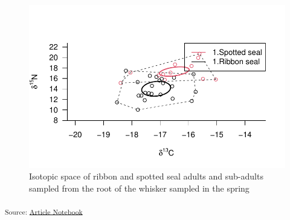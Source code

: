 \documentclass[
  letterpaper,
  DIV=11,
  numbers=noendperiod]{scrartcl}
\begin{document}
\begin{figure}[H]

{\centering \includegraphics{index_files/figure-pdf/unnamed-chunk-16-1.pdf}

}

\caption{Isotopic space of ribbon and spotted seal adults and sub-adults
sampled from the root of the whisker sampled in the spring}

\end{figure}%

\textsubscript{Source:
\href{https://noaa-afsc.github.io/ribbon-spotted-niche-partition/index.qmd.html}{Article
Notebook}}
\end{document}
